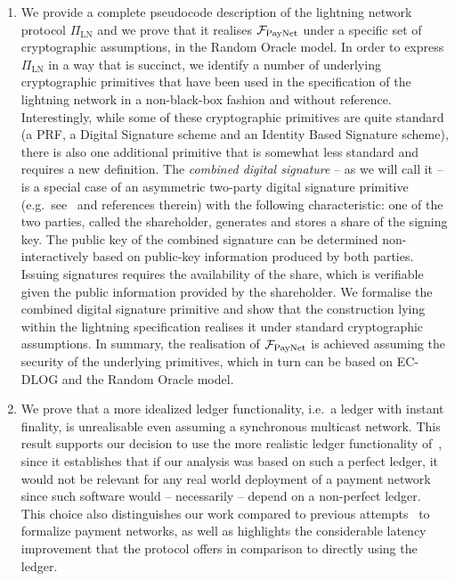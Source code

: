 \begin{enumerate}
\item We provide a complete pseudocode description of the lightning network
protocol $\Pi_{\mathrm{LN}}$ and we prove that it realises $\mathcal{F}_{\mathrm{PayNet}}{}$ under a specific set of cryptographic assumptions, in
the Random Oracle model. In order to express $\Pi_{\mathrm{LN}}$ in a way that
is succinct, we identify a number of underlying cryptographic
primitives that have been used in the specification of the lightning network in
a non-black-box fashion and without reference. Interestingly, while
some of these cryptographic primitives are quite standard (a PRF, a Digital Signature
scheme and an Identity Based Signature scheme), there is also one additional
primitive that is somewhat less standard and requires a new definition. The
\emph{combined digital signature} -- as we
will call it -- is a special case of an asymmetric two-party digital
signature primitive (e.g.\ see~\cite{DBLP:conf/ndss/NicolosiKDM03} and
references therein) with the following characteristic: one of
the two parties, called the shareholder, generates and stores a share of the signing
key. The public key of the combined signature can be
determined non-interactively based on public-key information produced by both
parties. Issuing signatures requires the availability of the share,
which is verifiable given the public information provided by the shareholder. We
formalise the combined digital signature primitive and show that the
construction lying within the lightning specification realises
it under standard cryptographic assumptions. In summary, the realisation of
$\mathcal{F}_{\mathrm{PayNet}}{}$ is achieved assuming the security of the underlying
primitives, which in turn can be based on EC-DLOG and the Random Oracle
model.

\item We prove that a more idealized ledger functionality, i.e.\ a ledger with
instant finality, is unrealisable even assuming a synchronous multicast network.
This result supports our decision to use the more realistic ledger functionality
of~\cite{BMTZ17}, since it establishes that if our analysis was based on such a
perfect ledger, it would not be relevant for any real world deployment of a
payment network since such software would -- necessarily -- depend on a
non-perfect ledger. This choice also distinguishes our work compared to previous
attempts~\cite{DBLP:conf/ccs/DziembowskiFH18,Malavolta:2017:CPP:3133956.3134096,sprites,perun}
to formalize payment networks, as well as highlights the considerable
latency improvement that the  protocol offers in comparison to directly
using the ledger.
\end{enumerate}

